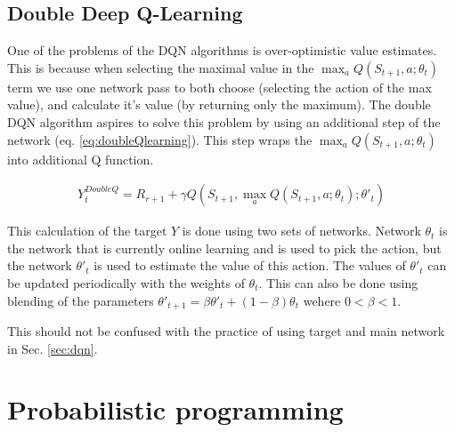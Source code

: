 \subsection{Double Deep Q-Learning}

One of the problems of the DQN algorithms is over-optimistic value estimates.
This is because when selecting the maximal value in the $\max_{a} Q(S_{t+1},a; \theta_{t})$ term we use one network pass to both choose (selecting the action of the max value), and calculate it's value (by returning only the maximum).
The double DQN algorithm \cite{https://doi.org/10.48550/arxiv.1509.06461} aspires to solve this problem by using an additional step of the network (eq. \ref{eq:doubleQlearning}).
This step wraps the $\max_{a} Q(S_{t+1},a; \theta_{t})$ into additional Q function.

\begin{align}
 Y_{t}^{DoubleQ} =  R_{r+1} + \gamma Q(S_{t+1}, \max_{a} Q(S_{t+1},a; \theta_{t}); \theta'_{t})
\label{eq:doubleQlearning}
\end{align}

This calculation of the target $Y$ is done using two sets of networks. Network $\theta_{t}$ is the network that is currently online learning and is used to pick the action, but the network $\theta'_{t}$ is used to estimate the value of this action.
The values of $\theta'_{t}$ can be updated periodically with the weights of $\theta_{t}$.
This can also be done using blending of the parameters $\theta'_{t+1} = \beta \theta'_{t} + (1-\beta)\theta_{t}$ wehere $0<\beta<1$.

This should not be confused with the practice of using target and main network in Sec. \ref{sec:dqn}.
\section{Probabilistic programming}
%
%

